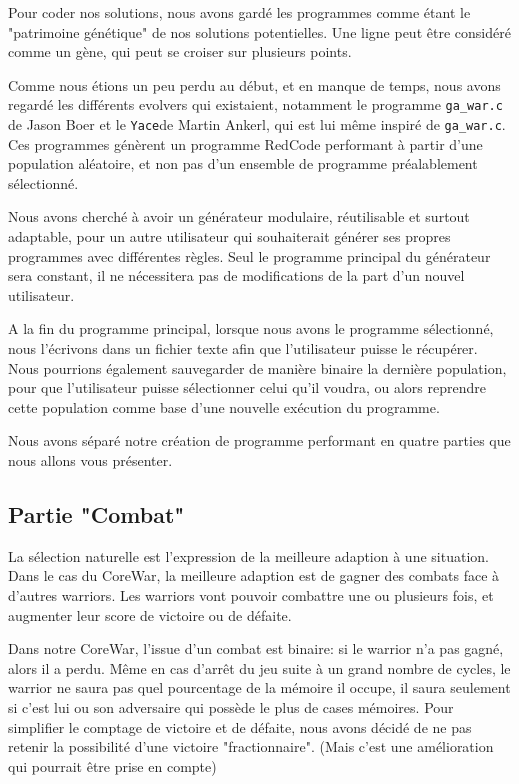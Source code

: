 \documentclass[hidelinks]{report}
\begin{document}
Pour coder nos solutions, nous avons gardé les programmes comme étant le "patrimoine génétique" de nos solutions potentielles. Une ligne peut être considéré comme un gène, qui peut se croiser sur plusieurs points.

Comme nous étions un peu perdu au début, et en manque de temps, nous avons regardé les différents evolvers qui existaient, notamment le programme \texttt{ga\_war.c} de Jason Boer et le \texttt{Yace}de Martin Ankerl, qui est lui même inspiré de \texttt{ga\_war.c}. Ces programmes génèrent un programme RedCode performant à partir d'une population aléatoire, et non pas d'un ensemble de programme préalablement sélectionné.

Nous avons cherché à avoir un générateur modulaire, réutilisable et surtout adaptable, pour un autre utilisateur qui souhaiterait générer ses propres programmes avec différentes règles. Seul le programme principal du générateur sera constant, il ne nécessitera pas de modifications de la part d'un nouvel utilisateur.

A la fin du programme principal, lorsque nous avons le programme sélectionné, nous l'écrivons dans un fichier texte afin que l'utilisateur puisse le récupérer. Nous pourrions également sauvegarder de manière binaire la dernière population, pour que l'utilisateur puisse sélectionner celui qu'il voudra, ou alors reprendre cette population comme base d'une nouvelle exécution du programme.

Nous avons séparé notre création de programme performant en quatre parties que nous allons vous présenter.


\subsection{Partie "Combat"}
La sélection naturelle est l'expression de la meilleure adaption à une situation. Dans le cas du CoreWar, la meilleure adaption est de gagner des combats face à d'autres warriors. Les warriors vont pouvoir combattre une ou plusieurs fois, et augmenter leur score de victoire ou de défaite. 

Dans notre CoreWar, l'issue d'un combat est binaire: si le warrior n'a pas gagné, alors il a perdu. Même en cas d'arrêt du jeu suite à un grand nombre de cycles, le warrior ne saura pas quel pourcentage de la mémoire il occupe, il saura seulement si c'est lui ou son adversaire qui possède le plus de cases mémoires. Pour simplifier le comptage de victoire et de défaite, nous avons décidé de ne pas retenir la possibilité d'une victoire "fractionnaire". (Mais c'est une amélioration qui pourrait être prise en compte)
\end{document}

